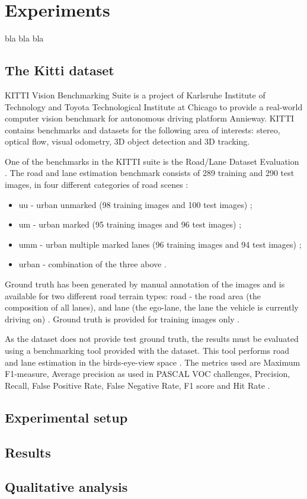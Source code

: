 \section{Experiments}
\label{sec:experiments}

bla bla bla

\subsection{The Kitti dataset}

KITTI Vision Benchmarking Suite is a project of Karlsruhe Institute of Technology and Toyota Technological Institute at Chicago to provide a real-world computer vision benchmark for autonomous driving platform Annieway. KITTI contains benchmarks and datasets for the following area of interests: stereo, optical flow, visual odometry, 3D object detection and 3D tracking.

One of the benchmarks in the KITTI suite is the Road/Lane Dataset Evaluation \cite{KITTI}. The road and lane estimation benchmark consists of 289 training and 290 test images, in four different categories of road scenes \cite{KITTI}:

\begin{itemize}
 \item uu - urban unmarked (98 training images and 100 test images) \cite{KITTI};
 \item um - urban marked (95 training images and 96 test images) \cite{KITTI};
 \item umm - urban multiple marked lanes (96 training images and 94 test images) \cite{KITTI};
 \item urban - combination of the three above \cite{KITTI}.
\end{itemize}

Ground truth has been generated by manual annotation of the images and is available for two different road terrain types: road - the road area (the composition of all lanes), and lane (the ego-lane, the lane the vehicle is currently driving on) \cite{KITTI} . Ground truth is provided for training images only \cite{KITTI}. 

As the dataset does not provide test ground truth, the results must be evaluated using a benchmarking tool provided with the dataset. This tool  performs road and lane estimation in the birds-eye-view space \cite{KITTI} . The metrics used are Maximum F1-measure, Average precision as used in PASCAL VOC challenges, Precision, Recall, False Positive Rate, False Negative Rate, F1 score and Hit Rate \cite{KITTI}.

\subsection{Experimental setup}

\subsection{Results}



\subsection{Qualitative analysis}